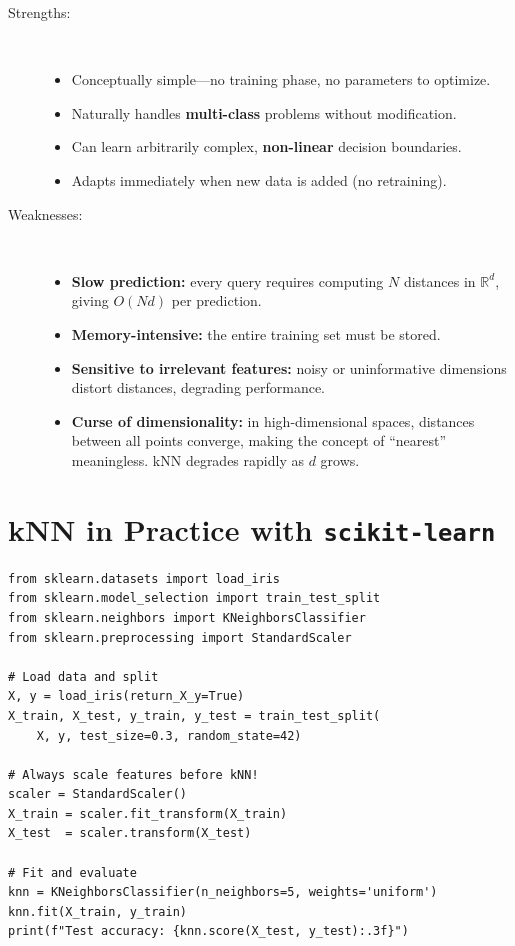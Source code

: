 \begin{description}
    \item[Strengths:]~
    \begin{itemize}
        \item Conceptually simple---no training phase, no parameters to optimize.
        \item Naturally handles \textbf{multi-class} problems without modification.
        \item Can learn arbitrarily complex, \textbf{non-linear} decision boundaries.
        \item Adapts immediately when new data is added (no retraining).
    \end{itemize}
    \item[Weaknesses:]~
    \begin{itemize}
        \item \textbf{Slow prediction:} every query requires computing $N$ distances in $\mathbb{R}^d$, giving $O(Nd)$ per prediction.
        \item \textbf{Memory-intensive:} the entire training set must be stored.
        \item \textbf{Sensitive to irrelevant features:} noisy or uninformative dimensions distort distances, degrading performance.
        \item \textbf{Curse of dimensionality:} in high-dimensional spaces, distances between all points converge, making the concept of ``nearest'' meaningless. kNN degrades rapidly as $d$ grows.
    \end{itemize}
\end{description}

\section*{kNN in Practice with \texttt{scikit-learn}}

\begin{lstlisting}[style=pythonstyle]
from sklearn.datasets import load_iris
from sklearn.model_selection import train_test_split
from sklearn.neighbors import KNeighborsClassifier
from sklearn.preprocessing import StandardScaler

# Load data and split
X, y = load_iris(return_X_y=True)
X_train, X_test, y_train, y_test = train_test_split(
    X, y, test_size=0.3, random_state=42)

# Always scale features before kNN!
scaler = StandardScaler()
X_train = scaler.fit_transform(X_train)
X_test  = scaler.transform(X_test)

# Fit and evaluate
knn = KNeighborsClassifier(n_neighbors=5, weights='uniform')
knn.fit(X_train, y_train)
print(f"Test accuracy: {knn.score(X_test, y_test):.3f}")
\end{lstlisting}

